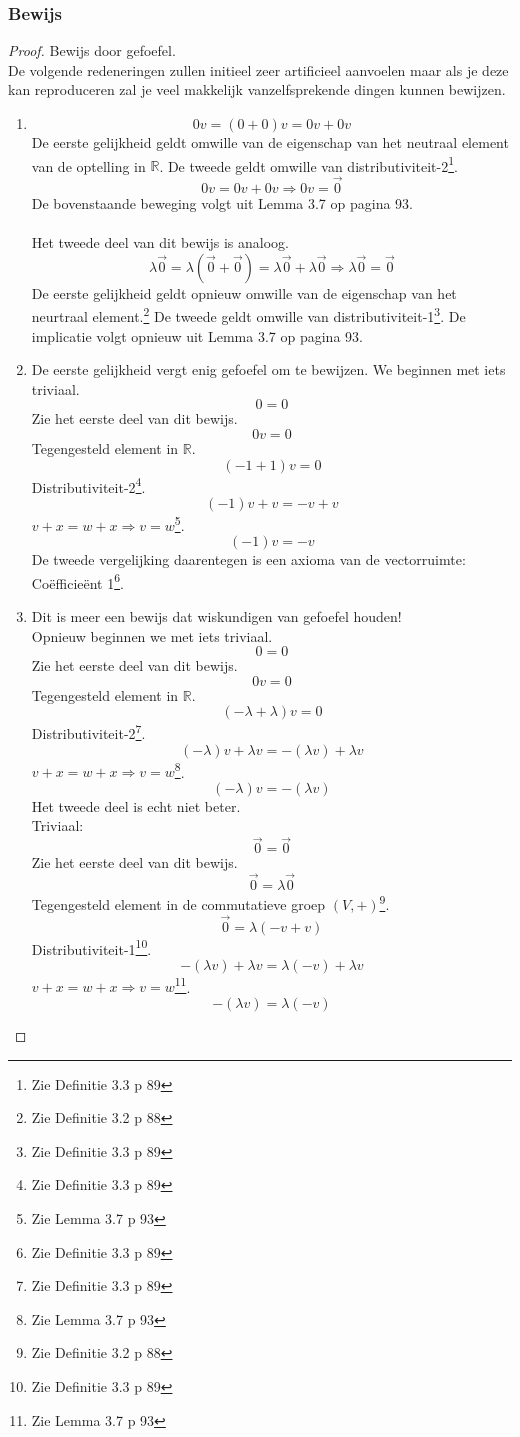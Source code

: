\documentclass[lineaire_algebra_oplossingen.tex]{subfiles}
\begin{document}
\subsubsection*{Bewijs}
\begin{proof}
Bewijs door gefoefel.\\
De volgende redeneringen zullen initieel zeer artificieel aanvoelen maar als je deze kan reproduceren zal je veel makkelijk vanzelfsprekende dingen kunnen bewijzen.
\begin{enumerate}
\item 
\[
0v = (0+0)v = 0v + 0v
\]
De eerste gelijkheid geldt omwille van de eigenschap van het neutraal element van de optelling in $\mathbb{R}$. De tweede geldt omwille van distributiviteit-2\footnote{Zie Definitie 3.3 p 89}.
\[
0v = 0v+0v \Rightarrow 0v = \vec{0}
\]
De bovenstaande beweging volgt uit Lemma 3.7 op pagina 93.\\\\
Het tweede deel van dit bewijs is analoog.
\[
\lambda\vec{0} = \lambda(\vec{0}+\vec{0}) = \lambda\vec{0} + \lambda\vec{0} \Rightarrow \lambda\vec{0} = \vec{0}
\]
De eerste gelijkheid geldt opnieuw omwille van de eigenschap van het neurtraal element.\footnote{Zie Definitie 3.2 p 88} De tweede geldt omwille van distributiviteit-1\footnote{Zie Definitie 3.3 p 89}. De implicatie volgt opnieuw uit Lemma 3.7 op pagina 93.

\item
De eerste gelijkheid vergt enig gefoefel om te bewijzen.
We beginnen met iets triviaal.
\[0 = 0\]
Zie het eerste deel van dit bewijs.
\[0v = 0\]
Tegengesteld element in $\mathbb{R}$.
\[(-1+1)v = 0\]
Distributiviteit-2\footnote{Zie Definitie 3.3 p 89}.
\[(-1)v + v = -v + v\]
$v+x=w+x \Rightarrow v=w$\footnote{Zie Lemma 3.7 p 93}.
\[ (-1)v = -v\]
De tweede vergelijking daarentegen is een axioma van de vectorruimte: Co\"efficie\"ent 1\footnote{Zie Definitie 3.3 p 89}.

\item Dit is meer een bewijs dat wiskundigen van gefoefel houden!\\
Opnieuw beginnen we met iets triviaal.
\[0=0\]
Zie het eerste deel van dit bewijs.
\[0v = 0\]
Tegengesteld element in $\mathbb{R}$.
\[(-\lambda+\lambda)v = 0\]
Distributiviteit-2\footnote{Zie Definitie 3.3 p 89}.
\[(-\lambda)v + \lambda v = -(\lambda v) + \lambda v\]
$v+x=w+x \Rightarrow v=w$\footnote{Zie Lemma 3.7 p 93}.
\[(-\lambda)v = -(\lambda v)\]
Het tweede deel is echt niet beter.\\
Triviaal:
\[\vec{0} = \vec{0}\]
Zie het eerste deel van dit bewijs.
\[\vec{0} = \lambda \vec{0}\]
Tegengesteld element in de commutatieve groep $(V,+)$\footnote{Zie Definitie 3.2 p 88}.
\[\vec{0} = \lambda (-v+v)\]
Distributiviteit-1\footnote{Zie Definitie 3.3 p 89}.
\[-(\lambda v) + \lambda v = \lambda(-v)+\lambda v\]
$v+x=w+x \Rightarrow v=w$\footnote{Zie Lemma 3.7 p 93}.
\[-(\lambda v) = \lambda(-v)\]
\end{enumerate}
\end{proof}
\end{document}

